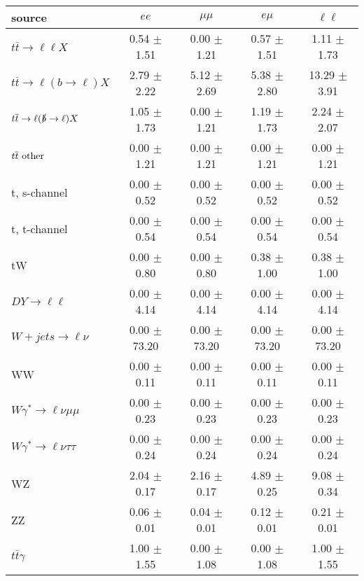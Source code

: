 \begin{tabular}{l|cccc} \hline\hline
source & $ee$ & $\mu\mu$ & $e\mu$ & $\ell\ell $ \\
\hline
$t\overline{t} \rightarrow \ell \ell X$ &  0.54 $\pm$  1.51 &  0.00 $\pm$  1.21 &  0.57 $\pm$  1.51 &  1.11 $\pm$  1.73 \\
$t\overline{t} \rightarrow \ell (b \rightarrow \ell) X$ &  2.79 $\pm$  2.22 &  5.12 $\pm$  2.69 &  5.38 $\pm$  2.80 & 13.29 $\pm$  3.91 \\
$t\overline{t} \rightarrow \ell (\slashed b \rightarrow \ell) X$ &  1.05 $\pm$  1.73 &  0.00 $\pm$  1.21 &  1.19 $\pm$  1.73 &  2.24 $\pm$  2.07 \\
        $t\overline{t}\ \rm{other}$ &  0.00 $\pm$  1.21 &  0.00 $\pm$  1.21 &  0.00 $\pm$  1.21 &  0.00 $\pm$  1.21 \\
\hline
                       t, s-channel &  0.00 $\pm$  0.52 &  0.00 $\pm$  0.52 &  0.00 $\pm$  0.52 &  0.00 $\pm$  0.52 \\
                       t, t-channel &  0.00 $\pm$  0.54 &  0.00 $\pm$  0.54 &  0.00 $\pm$  0.54 &  0.00 $\pm$  0.54 \\
                                 tW &  0.00 $\pm$  0.80 &  0.00 $\pm$  0.80 &  0.38 $\pm$  1.00 &  0.38 $\pm$  1.00 \\
\hline
         $DY \rightarrow \ell \ell$ &  0.00 $\pm$  4.14 &  0.00 $\pm$  4.14 &  0.00 $\pm$  4.14 &  0.00 $\pm$  4.14 \\
      $W+jets \rightarrow \ell \nu$ &  0.00 $\pm$ 73.20 &  0.00 $\pm$ 73.20 &  0.00 $\pm$ 73.20 &  0.00 $\pm$ 73.20 \\
                                 WW &  0.00 $\pm$  0.11 &  0.00 $\pm$  0.11 &  0.00 $\pm$  0.11 &  0.00 $\pm$  0.11 \\
\hline
$W\gamma^{*} \rightarrow \ell \nu \mu\mu$ &  0.00 $\pm$  0.23 &  0.00 $\pm$  0.23 &  0.00 $\pm$  0.23 &  0.00 $\pm$  0.23 \\
$W\gamma^{*} \rightarrow \ell \nu \tau\tau$ &  0.00 $\pm$  0.24 &  0.00 $\pm$  0.24 &  0.00 $\pm$  0.24 &  0.00 $\pm$  0.24 \\
                                 WZ &  2.04 $\pm$  0.17 &  2.16 $\pm$  0.17 &  4.89 $\pm$  0.25 &  9.08 $\pm$  0.34 \\
                                 ZZ &  0.06 $\pm$  0.01 &  0.04 $\pm$  0.01 &  0.12 $\pm$  0.01 &  0.21 $\pm$  0.01 \\
\hline
              $t\overline{t}\gamma$ &  1.00 $\pm$  1.55 &  0.00 $\pm$  1.08 &  0.00 $\pm$  1.08 &  1.00 $\pm$  1.55 \\

\end{tabular}
